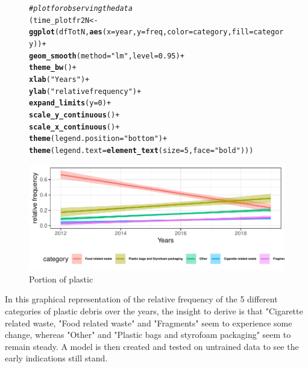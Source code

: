 \documentclass[10pt]{article}\usepackage[]{graphicx}\usepackage[]{color}
\makeatletter
\newcommand{\hlnum}[1]{\textcolor[rgb]{0.686,0.059,0.569}{#1}}%
\newcommand{\hlstr}[1]{\textcolor[rgb]{0.192,0.494,0.8}{#1}}%
\newcommand{\hlcom}[1]{\textcolor[rgb]{0.678,0.584,0.686}{\textit{#1}}}%
\newcommand{\hlopt}[1]{\textcolor[rgb]{0,0,0}{#1}}%
\newcommand{\hlstd}[1]{\textcolor[rgb]{0.345,0.345,0.345}{#1}}%
\newcommand{\hlkwb}[1]{\textcolor[rgb]{0.69,0.353,0.396}{#1}}%
\newcommand{\hlkwc}[1]{\textcolor[rgb]{0.333,0.667,0.333}{#1}}%
\newcommand{\hlkwd}[1]{\textcolor[rgb]{0.737,0.353,0.396}{\textbf{#1}}}%
\newenvironment{kframe}{%
 \def\at@end@of@kframe{}%
 \ifinner\ifhmode%
  \def\at@end@of@kframe{\end{minipage}}%
  \begin{minipage}{\columnwidth}%
 \fi\fi%
 \def\FrameCommand##1{\hskip\@totalleftmargin \hskip-\fboxsep
 \colorbox{shadecolor}{##1}\hskip-\fboxsep
     \hskip-\linewidth \hskip-\@totalleftmargin \hskip\columnwidth}%
 \MakeFramed {\advance\hsize-\width
   \@totalleftmargin\z@ \linewidth\hsize
   \@setminipage}}%
 {\par\unskip\endMakeFramed%
 \at@end@of@kframe}
\newenvironment{knitrout}{}{} %
\makeatother
\begin{document}
\begin{figure}[H] 
\begin{center}
\begin{knitrout}\small
{}\color{fgcolor}\begin{kframe}
\begin{alltt}
\hlcom{# plot for observing the data}
\hlstd{(time_plotfr2N} \hlkwb{<-} \hlkwd{ggplot}\hlstd{(dfTotN,} \hlkwd{aes}\hlstd{(}\hlkwc{x} \hlstd{= year,} \hlkwc{y} \hlstd{= freq,} \hlkwc{color}\hlstd{=category,} \hlkwc{fill} \hlstd{= category))} \hlopt{+}
  \hlkwd{geom_smooth}\hlstd{(}\hlkwc{method}\hlstd{=}\hlstr{"lm"}\hlstd{,} \hlkwc{level}\hlstd{=}\hlnum{0.95}\hlstd{)} \hlopt{+}
  \hlkwd{theme_bw}\hlstd{()} \hlopt{+}
  \hlkwd{xlab}\hlstd{(}\hlstr{"Years"}\hlstd{)} \hlopt{+}
  \hlkwd{ylab}\hlstd{(}\hlstr{"relative frequency"}\hlstd{)} \hlopt{+}
  \hlkwd{expand_limits}\hlstd{(}\hlkwc{y}\hlstd{=}\hlnum{0}\hlstd{)} \hlopt{+}
  \hlkwd{scale_y_continuous}\hlstd{()} \hlopt{+}
  \hlkwd{scale_x_continuous}\hlstd{()}\hlopt{+}
  \hlkwd{theme}\hlstd{(}\hlkwc{legend.position}\hlstd{=}\hlstr{"bottom"}\hlstd{)}\hlopt{+}
  \hlkwd{theme}\hlstd{(}\hlkwc{legend.text} \hlstd{=} \hlkwd{element_text}\hlstd{(}\hlkwc{size}\hlstd{=}\hlnum{5}\hlstd{,} \hlkwc{face}\hlstd{=}\hlstr{"bold"}\hlstd{)))}
\end{alltt}
\end{kframe}
\includegraphics[width=1\linewidth]{figure/unnamed-chunk-35-1} 

\end{knitrout}
\caption {Portion of plastic}
\label{figG1}
\end {center}
\end {figure}


In this graphical representation of the relative frequency of the 5 different categories of plastic debris over the years, the insight to derive is that "Cigarette related waste, "Food related waste" and "Fragments" seem to experience some change, whereas "Other" and "Plastic bags and styrofoam packaging" seem to remain steady. A model is then created and tested on untrained data to see the early indications still stand.
\end{document}
